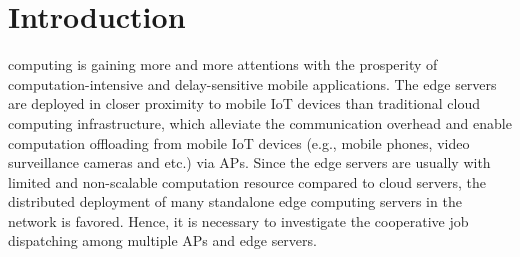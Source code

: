 \section{Introduction}
\label{sec:introduction}
 computing is gaining more and more attentions with the prosperity of computation-intensive and delay-sensitive mobile applications. %
The edge servers are deployed in closer proximity to mobile IoT devices than traditional cloud computing infrastructure, which alleviate the communication overhead and enable computation offloading {from mobile IoT devices (e.g., mobile phones, video surveillance cameras and etc.)} via APs.
Since the edge servers are usually with limited and non-scalable computation resource compared to cloud servers, the distributed deployment of many standalone edge computing servers in the network is favored.
Hence, it is necessary to investigate the cooperative job dispatching among multiple APs and edge servers.

